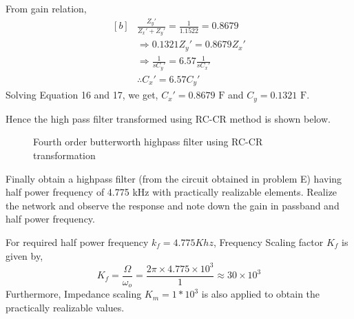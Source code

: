 \documentclass[a4paper,11pt]{article}
\begin{document}
From gain relation,
\begin{equation}
    \begin{aligned}[b]
         & \frac{Z_y'}{Z_x'+Z_y'}=\frac{1}{1.1522}=0.8679   \\
         & \Rightarrow 0.1321Z_y'=0.8679Z_x'                \\
         & \Rightarrow \frac{1}{sC_y'}=6.57 \frac{1}{sC_x'} \\
         & \therefore C_x'=6.57 C_y'
    \end{aligned}
\end{equation}
Solving Equation 16 and 17, we get, $C_x'=0.8679\text{ F}$ and $C_y=0.1321\text{ F}$.

Hence the high pass filter transformed using RC-CR method is shown below.

\begin{figure}[H]
    \centering
    \figfourthorderhp
    \caption{Fourth order butterworth highpass filter using RC-CR transformation}
\end{figure}

\pagebreak

\begin{Q}
    {
        Finally obtain a highpass filter (from the circuit obtained in problem E) having half power
        frequency of 4.775 kHz with practically realizable elements. Realize the network and observe the
        response and note down the gain in passband and half power frequency.
    }
\end{Q}


For required half power frequency $k_f =4.775 Khz$, Frequency Scaling factor $K_f$ is given by,
\begin{equation}
    K_f=\frac{\Omega}{\omega_o}=\frac{2\pi\times4.775\times10^3}{1}\approx 30\times10^3
\end{equation}
Furthermore, Impedance scaling $K_m= 1 *10^3$ is also applied to obtain the practically realizable values.
\end{document}
